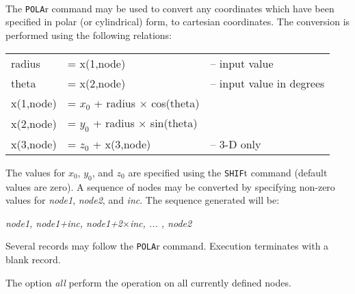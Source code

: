  \\{\smallskip}
 \\{\smallskip}
 \\{\smallskip}
\headb

The {\tt POLA}r command may be used to convert  any  coordinates
which have been specified in polar (or cylindrical)
form, to cartesian coordinates.  The conversion is performed
using the following relations:

\begin{center}
\begin{tabular}{l l l}
radius    & = x(1,node) &  -- input value \\
theta     & = x(2,node) &  -- input value in degrees \\
x(1,node) & = $x_0$ + radius $\times$ cos(theta) \\
x(2,node) & = $y_0$ + radius $\times$ sin(theta) \\
x(3,node) & = $z_0$ + x(3,node) &  -- 3-D only \\
\end{tabular}
\end{center}
The values for $x_0$, $y_0$, and $z_0$ are specified using the {\tt SHIF}t
command (default values are zero).
A sequence of nodes may be converted by specifying  non-zero
values  for  {\it node1},  {\it node2}, and {\it inc}.  The sequence generated
will be:

\begin{center}
{\it node1, node1+inc, node1+2$\times$inc,  ...  , node2}
\end{center}

Several records may follow the {\tt POLA}r command.   Execution
terminates with a blank record.

The option {\it all} perform the operation on all currently defined nodes.
\vfil\eject
